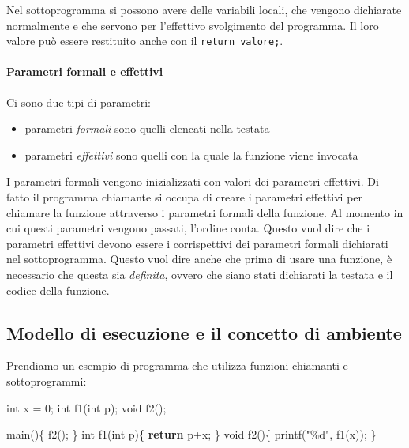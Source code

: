 \documentclass[
]{article}
\newenvironment{Shaded}{}{}
\newcommand{\ControlFlowTok}[1]{\textcolor[rgb]{0.00,0.44,0.13}{\textbf{#1}}}
\newcommand{\DataTypeTok}[1]{\textcolor[rgb]{0.56,0.13,0.00}{#1}}
\newcommand{\DecValTok}[1]{\textcolor[rgb]{0.25,0.63,0.44}{#1}}
\newcommand{\NormalTok}[1]{#1}
\newcommand{\StringTok}[1]{\textcolor[rgb]{0.25,0.44,0.63}{#1}}
\begin{document}
Nel sottoprogramma si possono avere delle variabili locali, che vengono
dichiarate normalmente e che servono per l'effettivo svolgimento del
programma. Il loro valore può essere restituito anche con il
\texttt{return\ valore;}.

\hypertarget{header-n818}{%
\paragraph{Parametri formali e effettivi}\label{header-n818}}

Ci sono due tipi di parametri:

\begin{itemize}
\item
  parametri \emph{formali} sono quelli elencati nella testata
\item
  parametri \emph{effettivi} sono quelli con la quale la funzione viene
  invocata
\end{itemize}

I parametri formali vengono inizializzati con valori dei parametri
effettivi. Di fatto il programma chiamante si occupa di creare i
parametri effettivi per chiamare la funzione attraverso i parametri
formali della funzione. Al momento in cui questi parametri vengono
passati, l'ordine conta. Questo vuol dire che i parametri effettivi
devono essere i corrispettivi dei parametri formali dichiarati nel
sottoprogramma. Questo vuol dire anche che prima di usare una funzione,
è necessario che questa sia \emph{definita}, ovvero che siano stati
dichiarati la testata e il codice della funzione.

\hypertarget{header-n827}{%
\subsection{Modello di esecuzione e il concetto di
ambiente}\label{header-n827}}

Prendiamo un esempio di programma che utilizza funzioni chiamanti e
sottoprogrammi:

\begin{Shaded}
\begin{Highlighting}[]
\DataTypeTok{int}\NormalTok{ x = }\DecValTok{0}\NormalTok{;}
\DataTypeTok{int}\NormalTok{ f1(}\DataTypeTok{int}\NormalTok{ p);}
\DataTypeTok{void}\NormalTok{ f2();}

\NormalTok{main()\{}
\NormalTok{    f2();}
\NormalTok{\}}
\DataTypeTok{int}\NormalTok{ f1(}\DataTypeTok{int}\NormalTok{ p)\{}
    \ControlFlowTok{return}\NormalTok{ p+x;}
\NormalTok{\}}
\DataTypeTok{void}\NormalTok{ f2()\{}
\NormalTok{    printf(}\StringTok{"\%d"}\NormalTok{, f1(x));}
\NormalTok{\}}
\end{Highlighting}
\end{Shaded}
\end{document}
